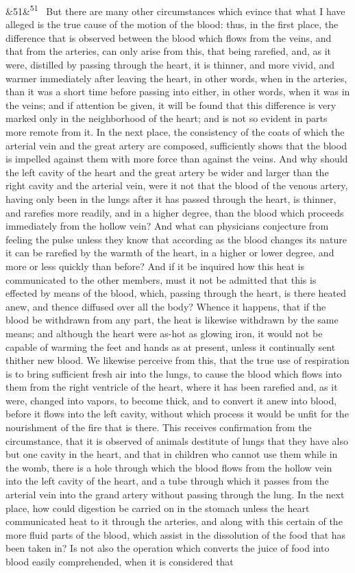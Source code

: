 \documentclass[12pt]{article}
\newcommand{\para}[1][]{\par\noindent\ifx&#1&\else\textsuperscript{\footnotesize #1}~\fi}
\begin{document}
\para[51] But there are many other circumstances which evince that what I have alleged is the true cause of the motion of the blood: thus, in the first place, the difference that is observed between the blood which flows from the veins, and that from the arteries, can only arise from this, that being rarefied, and, as it were, distilled by passing through the heart, it is thinner, and more vivid, and warmer immediately after leaving the heart, in other words, when in the arteries, than it was a short time before passing into either, in other words, when it was in the veins; and if attention be given, it will be found that this difference is very marked only in the neighborhood of the heart; and is not so evident in parts more remote from it. In the next place, the consistency of the coats of which the arterial vein and the great artery are composed, sufficiently shows that the blood is impelled against them with more force than against the veins. And why should the left cavity of the heart and the great artery be wider and larger than the right cavity and the arterial vein, were it not that the blood of the venous artery, having only been in the lungs after it has passed through the heart, is thinner, and rarefies more readily, and in a higher degree, than the blood which proceeds immediately from the hollow vein? And what can physicians conjecture from feeling the pulse unless they know that according as the blood changes its nature it can be rarefied by the warmth of the heart, in a higher or lower degree, and more or less quickly than before? And if it be inquired how this heat is communicated to the other members, must it not be admitted that this is effected by means of the blood, which, passing through the heart, is there heated anew, and thence diffused over all the body? Whence it happens, that if the blood be withdrawn from any part, the heat is likewise withdrawn by the same means; and although the heart were as-hot as glowing iron, it would not be capable of warming the feet and hands as at present, unless it continually sent thither new blood. We likewise perceive from this, that the true use of respiration is to bring sufficient fresh air into the lungs, to cause the blood which flows into them from the right ventricle of the heart, where it has been rarefied and, as it were, changed into vapors, to become thick, and to convert it anew into blood, before it flows into the left cavity, without which process it would be unfit for the nourishment of the fire that is there. This receives confirmation from the circumstance, that it is observed of animals destitute of lungs that they have also but one cavity in the heart, and that in children who cannot use them while in the womb, there is a hole through which the blood flows from the hollow vein into the left cavity of the heart, and a tube through which it passes from the arterial vein into the grand artery without passing through the lung. In the next place, how could digestion be carried on in the stomach unless the heart communicated heat to it through the arteries, and along with this certain of the more fluid parts of the blood, which assist in the dissolution of the food that has been taken in? Is not also the operation which converts the juice of food into blood easily comprehended, when it is considered that 
\end{document}
